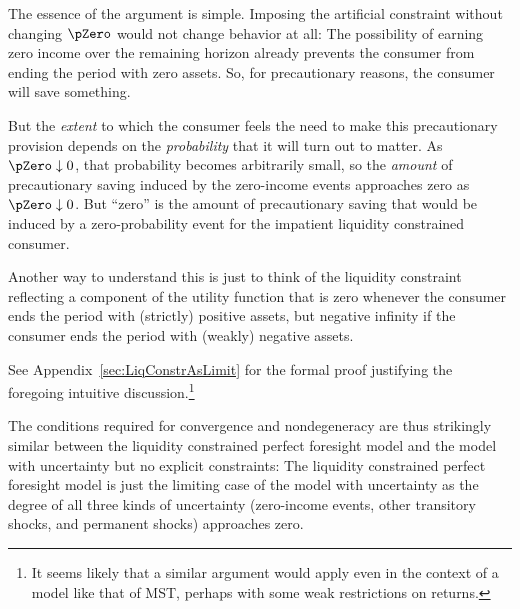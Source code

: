 \documentclass[BufferStockTheory]{subfiles}
\begin{document}
The essence of the argument is simple.  Imposing the artificial constraint without changing $\pZero$ would not change behavior at all: The possibility of earning zero income over the remaining horizon already prevents the consumer from ending the period with zero assets.  So, for precautionary reasons, the consumer will save something.

But the \textit{extent} to which the consumer feels the need to make this precautionary provision depends on the \textit{probability} that it will turn out to matter.  As $\pZero \downarrow 0$, that probability becomes arbitrarily small, so the \textit{amount} of precautionary saving induced by the zero-income events approaches zero as $\pZero \downarrow 0$.  But ``zero'' is the amount of precautionary saving that would be induced by a zero-probability event for the impatient liquidity constrained consumer.

Another way to understand this is just to think of the liquidity constraint reflecting a component of the utility function that is zero whenever the consumer ends the period with (strictly) positive assets, but negative infinity if the consumer ends the period with (weakly) negative assets.



\hypertarget{Factors-Defined-And-Compared}{}


See Appendix~\ref{sec:LiqConstrAsLimit} for the formal proof justifying the foregoing intuitive discussion.\footnote{It seems likely that a similar argument would apply even in the context of a model like that of MST, perhaps with some weak restrictions on returns.}

The conditions required for convergence and nondegeneracy are thus strikingly similar between the liquidity constrained perfect foresight model and the model with uncertainty but no explicit constraints: The liquidity constrained perfect foresight model is just the limiting case of the model with uncertainty as the degree of all three kinds of uncertainty (zero-income events, other transitory shocks, and permanent shocks) approaches zero.



\hypertarget{Relations-Between-Parametric-Restrictions}{}
\end{document}
